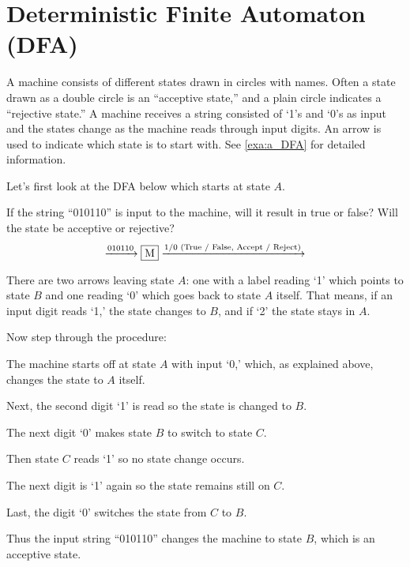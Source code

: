 
\section{Deterministic Finite Automaton (DFA)}

A machine consists of different states drawn in circles with names. Often a state drawn as
a double circle is an ``acceptive state,'' and a plain circle indicates a ``rejective
state.'' A machine receives a string consisted of `1's and `0's as input and the states
change as the machine reads through input digits. An arrow is used to indicate which state
is to start with. See \autoref{exa:a_DFA} for detailed information.

\begin{example}[A DFA]
    \label{exa:a_DFA}

    Let's first look at the DFA below which starts at state $A$.

    If the string ``010110'' is input to the machine, will it result in true or false?
    Will the state be acceptive or rejective?
    \[
        \xrightarrow{010110}
        \fbox{M}
        \xrightarrow{1/0 \text{ (True / False, Accept / Reject)}}
    \]

    There are two arrows leaving state $A$: one with a label reading `1' which points to
    state $B$ and one reading `0' which goes back to state $A$ itself. That means, if an
    input digit reads `1,' the state changes to $B$, and if `2' the state stays in $A$.

    Now step through the procedure:
    \begin{compactenum}
    \item
        The machine starts off at state $A$ with input `0,' which, as explained above,
        changes the state to $A$ itself.
    \item
        Next, the second digit `1' is read so the state is changed to $B$.
    \item
        The next digit `0' makes state $B$ to switch to state $C$.
    \item
        Then state $C$ reads `1' so no state change occurs.
    \item
        The next digit is `1' again so the state remains still on $C$.
    \item
        Last, the digit `0' switches the state from $C$ to $B$.
    \end{compactenum}
    Thus the input string ``010110'' changes the machine to state $B$, which is an
    acceptive state.

\end{example}

